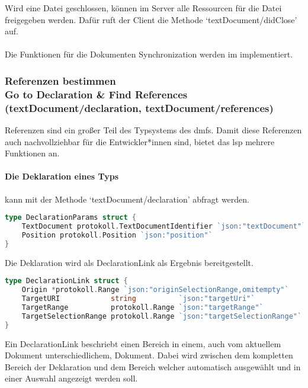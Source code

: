 \documentclass[./einleitung.tex]{subfiles}
\begin{document}
    Wird eine Datei geschlossen, können im Server alle Ressourcen für die Datei freigegeben werden.
    Dafür ruft der Client die Methode `textDocument/didClose' auf.
    \\\\
    Die Funktionen für die Dokumenten Synchronization werden im  implementiert.

    \subsubsection[Referenzen bestimmen]{Referenzen bestimmen\\ {\textnormal{\footnotesize Go to Declaration \& Find References \\ (textDocument/declaration, textDocument/references) \cite{declaration} \cite{references}}}}\label{subsubsec:referenzen}
    Referenzen sind ein großer Teil des Typsystems des \acrshort{dmf}s.
    Damit diese Referenzen auch nachvollziehbar für die Entwickler*innen sind, bietet das \acrshort{lsp} mehrere Funktionen an.
    \paragraph{Die Deklaration eines Typs} kann mit der Methode `textDocument/declaration' abfragt werden.
    \begin{lstlisting}[language=Go, title=Definition der Parameter, caption=Definition der Deklarations-Parameter, label=lst:declarationParams]
type DeclarationParams struct {
	TextDocument protokoll.TextDocumentIdentifier `json:"textDocument"`
	Position protokoll.Position `json:"position"`
}
    \end{lstlisting}
    Die Deklaration wird als DeclarationLink als Ergebnis bereitgestellt.
    \begin{lstlisting}[language=Go, title=Definition des DeclarationLink , label=lst:locationLink]
type DeclarationLink struct {
	Origin *protokoll.Range `json:"originSelectionRange,omitempty"`
	TargetURI            string          `json:"targetUri"`
	TargetRange          protokoll.Range `json:"targetRange"`
	TargetSelectionRange protokoll.Range `json:"targetSelectionRange"`
}
    \end{lstlisting}
    Ein DeclarationLink beschriebt einen Bereich in einem, auch vom aktuellem Dokument unterschiedlichem, Dokument.
    Dabei wird zwischen dem kompletten Bereich der Deklaration und dem Bereich welcher automatisch ausgewählt und in einer Auswahl angezeigt werden soll.
\end{document}
